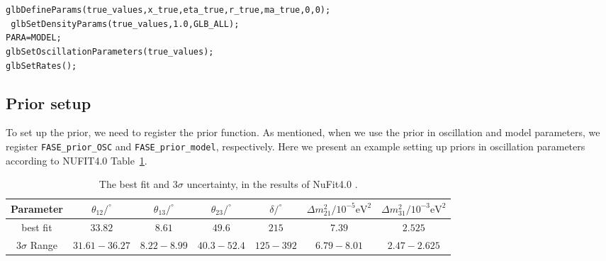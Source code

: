\documentclass[aps,prd,nofootinbib,preprint]{revtex4}
\begin{document}
\texttt{glbDefineParams(true\_values,x\_true,eta\_true,r\_true,ma\_true,0,0);}\\
\texttt{    glbSetDensityParams(true\_values,1.0,GLB\_ALL);}\\
\texttt{PARA=MODEL;\\
    glbSetOscillationParameters(true\_values);\\
    glbSetRates();}\vspace{0.2cm}\\
    
\subsection{Prior setup} 

To set up the prior, we need to register the prior function. As mentioned, when we use the prior in oscillation and model parameters, we register \texttt{FASE\_prior\_OSC} and \texttt{FASE\_prior\_model}, respectively. Here we present an example setting up priors in oscillation parameters according to NUFIT4.0 Table~\ref{tab:nufit4.0}.

\begin{table}[!h]
\caption{The best fit and $3\sigma$ uncertainty, in the results of NuFit4.0 \cite{Esteban:2018azc}.}
\begin{tabular}{|c|c|c|c|c|c|c|}
\hline
Parameter & $\theta_{12}/^\circ$ & $\theta_{13}/^\circ$ & $\theta_{23}/^\circ$ & $\delta/^\circ$  & $\Delta m_{21}^2/10^{-5}\text{eV}^2$ & $\Delta m_{31}^2/10^{-3}\text{eV}^2$\\ \hline\hline
best fit & $33.82$ & $8.61$ & $49.6$ & $215$ & $7.39$ & $2.525$ \\\hline
$3\sigma$ Range & $31.61-36.27$ & $8.22-8.99$ & $40.3-52.4$ & $125-392$ & $6.79-8.01$ & $2.47-2.625$ \\\hline
\end{tabular}
\label{tab:nufit4.0}
\end{table}
\end{document}
